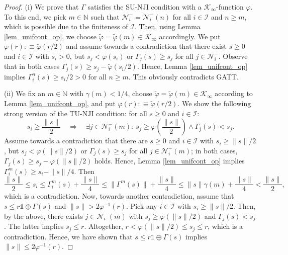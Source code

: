 \documentclass[10pt, oneside, a4paper]{article}
\newcommand{\N}{\mathbb{N}}
\newcommand{\unit}{\mathds{1}}
\newcommand{\IC}{\mathcal{I}}
\newcommand{\KC}{\mathcal{K}}
\newcommand{\NC}{\mathcal{N}}
\begin{document}
\begin{proof}
(i) We prove that $\Gamma$ satisfies the SU-NJI condition with a $\KC_{\infty}$-function $\varphi$. To this end, we pick $m \in \N$ such that $\NC^-_i = \NC^-_i(n)$ for all $i \in \IC$ and $n \geq m$, which is possible due to the finiteness of $\IC$. Then, using Lemma \ref{lem_unifcont_op}, we choose $\tilde{\varphi} = \tilde{\varphi}(m) \in \KC_{\infty}$ accordingly. We put $\varphi(r) :\equiv \tilde{\varphi}(r/2)$ and assume towards a contradiction that there exist $s \geq 0$ and $i \in \IC$ with $s_i > 0$, but $s_j < \varphi(s_i)$ or $\Gamma_j(s) \geq s_j$ for all $j \in \NC^-_i$. Observe that in both cases $\Gamma_j(s) \geq s_j - \tilde{\varphi}(s_i/2)$. Hence, Lemma \ref{lem_unifcont_op} implies $\Gamma_i^n(s) \geq s_i/2 > 0$ for all $n \geq m$. This obviously contradicts GATT.%

(ii) We fix an $m \in \N$ with $\gamma(m) < 1/4$, choose $\tilde{\varphi} = \tilde{\varphi}(m) \in \KC_{\infty}$ according to Lemma \ref{lem_unifcont_op}, and put $\varphi(r) :\equiv \tilde{\varphi}(r/2)$. We show the following strong version of the TU-NJI condition: for all $s \geq 0$ and $i \in \IC$:%
\begin{equation*}
  s_i \geq \frac{\|s\|}{2} \quad \Rightarrow \quad \exists j \in \NC^-_i(m):\ s_j \geq \varphi\left(\frac{\|s\|}{2}\right) \wedge \Gamma_j(s) < s_j.%
\end{equation*}
Assume towards a contradiction that there are $s \geq 0$ and $i \in \IC$ with $s_i \geq \|s\|/2$, but $s_j < \varphi(\|s\|/2)$ or $\Gamma_j(s) \geq s_j$ for all $j \in \NC^-_i(m)$; in both cases, $\Gamma_j(s) \geq s_j - \varphi(\|s\|/2)$ holds. Hence, Lemma \ref{lem_unifcont_op} implies $\Gamma_i^m(s) \geq s_i - \|s\|/4$. Then%
\begin{equation*}
  \frac{\|s\|}{2} \leq s_i \leq \Gamma_i^m(s) + \frac{\|s\|}{4} \leq \|\Gamma^m(s)\| + \frac{\|s\|}{4} \leq \|s\|\gamma(m) + \frac{\|s\|}{4} < \frac{\|s\|}{2},%
\end{equation*}
which is a contradiction. Now, towards another contradiction, assume that $s \leq r\unit \oplus \Gamma(s)$ and $\|s\| > 2\varphi^{-1}(r)$. Pick any $i \in \IC$ with $s_i \geq \|s\|/2$. Then, by the above, there exists $j \in \NC^-_i(m)$ with $s_j \geq \varphi(\|s\|/2)$ and $\Gamma_j(s) < s_j$. The latter implies $s_j \leq r$. Altogether, $r < \varphi(\|s\|/2) \leq s_j \leq r$, which is a contradiction. Hence, we have shown that $s \leq r\unit \oplus \Gamma(s)$ implies $\|s\| \leq 2\varphi^{-1}(r)$.
\end{proof}
\end{document}
